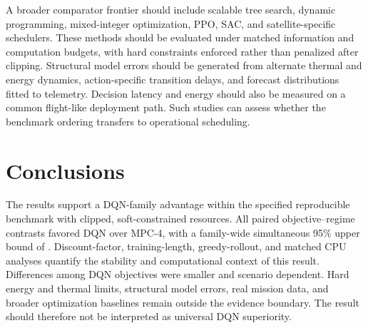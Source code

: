 \documentclass[remotesensing,article,submit,moreauthors]{Definitions/mdpi}
\newenvironment{revisedblock}{\color{red}}{}
\newenvironment{revisedblock}{}{}
\begin{document}
\begin{revisedblock}
A broader comparator frontier should include scalable tree search, dynamic programming, mixed-integer optimization, PPO, SAC, and satellite-specific schedulers. These methods should be evaluated under matched information and computation budgets, with hard constraints enforced rather than penalized after clipping. Structural model errors should be generated from alternate thermal and energy dynamics, action-specific transition delays, and forecast distributions fitted to telemetry. Decision latency and energy should also be measured on a common flight-like deployment path. Such studies can assess whether the benchmark ordering transfers to operational scheduling.
\end{revisedblock}

\section{Conclusions}

\begin{revisedblock}
The results support a DQN-family advantage within the specified reproducible benchmark with clipped, soft-constrained resources. All \DQNvsMPCContrastCount{} paired objective--regime contrasts favored DQN over MPC-4, with a family-wide simultaneous 95\% upper bound of \DQNvsMPCGlobalUpperBound. Discount-factor, training-length, greedy-rollout, and matched CPU analyses quantify the stability and computational context of this result. Differences among DQN objectives were smaller and scenario dependent. Hard energy and thermal limits, structural model errors, real mission data, and broader optimization baselines remain outside the evidence boundary. The result should therefore not be interpreted as universal DQN superiority.
\end{revisedblock}

\end{document}

